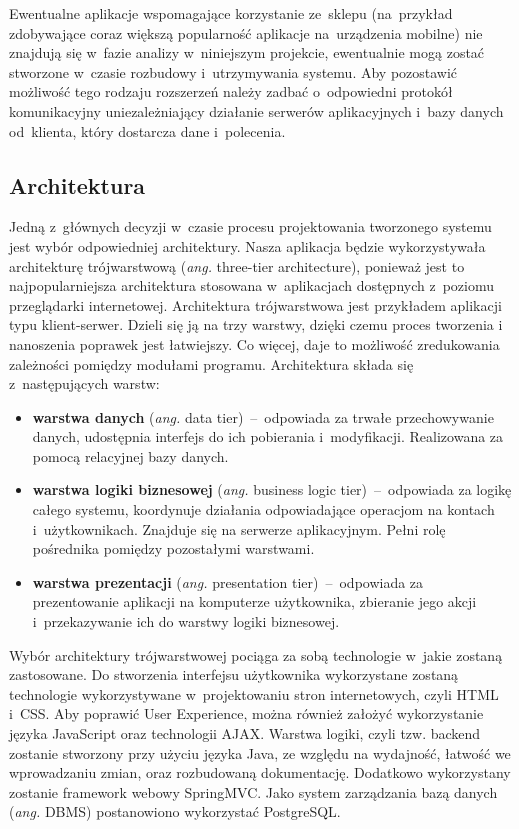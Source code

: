 Ewentualne aplikacje wspomagające korzystanie ze~sklepu (na~przykład zdobywające coraz większą popularność aplikacje na~urządzenia mobilne) nie znajdują się w~fazie analizy w~niniejszym projekcie, ewentualnie mogą zostać stworzone w~czasie rozbudowy i~utrzymywania systemu. Aby pozostawić możliwość tego rodzaju rozszerzeń należy zadbać o~odpowiedni protokół komunikacyjny uniezależniający działanie serwerów aplikacyjnych i~bazy danych od~klienta, który dostarcza dane i~polecenia.

\subsection{Architektura}

Jedną z~głównych decyzji w~czasie procesu projektowania tworzonego systemu jest wybór odpowiedniej architektury. Nasza
aplikacja będzie wykorzystywała architekturę trójwarstwową (\textit{ang.} three-tier architecture), ponieważ jest to
najpopularniejsza architektura stosowana w~aplikacjach dostępnych z~poziomu przeglądarki internetowej. Architektura
trójwarstwowa jest przykładem aplikacji typu klient-serwer. Dzieli się ją na trzy warstwy, dzięki czemu proces tworzenia
i nanoszenia poprawek jest łatwiejszy. Co więcej, daje to możliwość zredukowania zależności pomiędzy modułami programu.
Architektura składa się z~następujących warstw: 
\begin{itemize}
  \item \textbf{warstwa danych} (\textit{ang.} data tier)~--~odpowiada za trwałe przechowywanie danych, udostępnia
    interfejs do ich pobierania i~modyfikacji. Realizowana za pomocą relacyjnej bazy danych.
  \item \textbf{warstwa logiki biznesowej} (\textit{ang.} business logic tier)~--~odpowiada za logikę całego systemu,
  koordynuje działania odpowiadające operacjom na kontach i~użytkownikach. Znajduje się na serwerze aplikacyjnym. Pełni
  rolę pośrednika pomiędzy pozostałymi warstwami.
  \item \textbf{warstwa prezentacji} (\textit{ang.} presentation tier)~--~odpowiada za prezentowanie aplikacji na
  komputerze użytkownika, zbieranie jego akcji i~przekazywanie ich do warstwy logiki biznesowej.
\end{itemize}

Wybór architektury trójwarstwowej pociąga za sobą technologie w~jakie zostaną zastosowane. Do stworzenia interfejsu
użytkownika wykorzystane zostaną technologie wykorzystywane w~projektowaniu stron internetowych, czyli HTML i~CSS. Aby
poprawić User Experience, można również założyć wykorzystanie języka JavaScript oraz technologii AJAX. Warstwa logiki,
czyli tzw. backend zostanie stworzony przy użyciu języka Java, ze względu na wydajność, łatwość we wprowadzaniu
zmian, oraz rozbudowaną dokumentację. Dodatkowo wykorzystany zostanie framework webowy SpringMVC. Jako system
zarządzania bazą danych (\textit{ang.} DBMS) postanowiono wykorzystać PostgreSQL.

